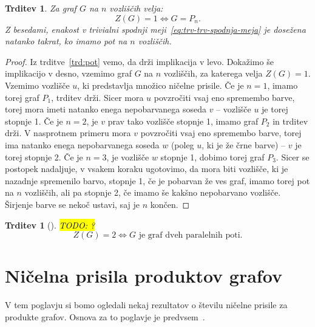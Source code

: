 \documentclass[12pt,a4paper,twoside]{article}
\theoremstyle{definition} %
\theoremstyle{plain} %
\newtheorem{trditev}[definicija]{Trditev}
\numberwithin{equation}{section}  %
\begin{document}
\begin{trditev}
    Za graf $G$ na $n$ vozliščih velja: 
    \[ Z(G) = 1 \iff G = P_n. \]
    Z besedami, enakost v trivialni spodnji meji~\eqref{eq:trv-trv-spodnja-meja} je dosežena natanko takrat, ko imamo pot na $n$ vozliščih.
\end{trditev}
\begin{proof}
    Iz trditve~\ref{trd:pot} vemo, da drži implikacija v levo. Dokažimo še implikacijo v desno, vzemimo graf $G$ na $n$ vozliščih, za katerega velja $Z(G) = 1$. Vzemimo vozlišče $u$, ki predstavlja množico ničelne prisile. Če je $n = 1$, imamo torej graf $P_1$, trditev drži. Sicer mora $u$ povzročiti vsaj eno spremembo barve, torej mora imeti natanko enega nepobarvanega soseda $v$ -- vozlišče $u$ je torej stopnje 1. Če je $n=2$, je $v$ prav tako vozlišče stopnje 1, imamo graf $P_2$ in trditev drži.  V nasprotnem primeru mora $v$ povzročiti vsaj eno spremembo barve, torej ima natanko enega nepobarvanega soseda $w$ (poleg $u$, ki je že črne barve) -- $v$ je torej stopnje 2. Če je $n=3$, je vozlišče $w$ stopnje 1, dobimo torej graf $P_3$. Sicer se postopek nadaljuje, v vsakem koraku ugotovimo, da mora biti vozlišče, ki je nazadnje spremenilo barvo, stopnje 1, če je pobarvan že ves graf, imamo torej pot na $n$ vozliščih, ali pa stopnje 2, če imamo še kakšno nepobarvano vozlišče. Širjenje barve se nekoč ustavi, saj je $n$ končen.
\end{proof}

\begin{trditev}[{\cite[izrek~2.3]{row2012technique}}]
    \hl{TODO: ?}
    \[ Z(G) = 2 \iff G \text{ je graf dveh paralelnih poti}.  \]
\end{trditev}

\section{Ničelna prisila produktov grafov}
V tem poglavju si bomo ogledali nekaj rezultatov o številu ničelne prisile za produkte grafov. Osnova za to poglavje je predvsem~\cite{aim2008minimumrank}.
\end{document}
